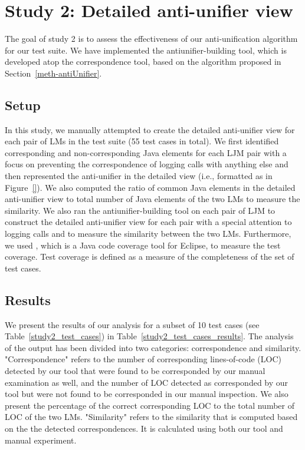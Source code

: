 \section{Study 2: Detailed anti-unifier view}  \label{study2}
The goal of study 2 is to assess the effectiveness of our anti-unification algorithm for our test suite. We have implemented the antiunifier-building tool, which is developed atop the correspondence tool, based on the algorithm proposed in Section~\ref{meth-antiUnifier}.

\subsection{Setup}  \label{study2-setup}
In this study, we manually attempted to create the detailed anti-unifier view for each pair of LMs in the test suite (55 test cases in total). We first identified corresponding and non-corresponding Java elements for each LJM pair with a focus on preventing the correspondence of logging calls with anything else and then represented the anti-unifier in the detailed view (i.e., formatted as in Figure~\ref{}). We also computed the ratio of common Java elements in the detailed anti-unifier view to total number of Java elements of the two LMs to measure the similarity.
We also ran the antiunifier-building tool on each pair of LJM to construct the detailed anti-unifier view for each pair with a special attention to logging calls and to measure the similarity between the two LMs. Furthermore, we used , which is a Java code coverage tool for Eclipse, to measure the test coverage. Test coverage is defined as a measure of the completeness of the set of test cases.



\subsection{Results}  \label{study2-results}
We present the results of our analysis for a subset of 10 test cases (see Table~\ref{study2_test_cases}) in Table~\ref{study2_test_cases_results}. The analysis of the output has been divided into two categories: correspondence and similarity. "Correspondence" refers to the number of corresponding lines-of-code (LOC) detected by our tool that were found to be corresponded by our manual examination as well, and the number of LOC detected as corresponded by our tool but were not found to be corresponded in our manual inspection. We also present the percentage of the correct corresponding LOC to the total number of LOC of the two LMs. "Similarity" refers to the similarity that is computed based on the the detected correspondences. It is calculated using both our tool and manual experiment.



